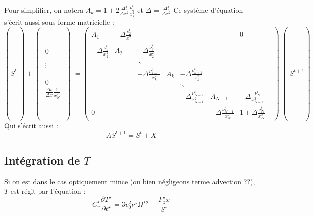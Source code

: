 Pour simplifier, on notera $A_k = 1 + 2 \frac{\Delta t}{\Delta x^2}\frac{\nu_k^t}{x_k^2}$ et $\Delta = \frac{\Delta t}{\Delta x^2}$
Ce système d'équation s'écrit aussi sous forme matricielle :
\begin{equation}
  \left(S^t\middle) + 
  \middle(\begin{matrix}
    0 \\
    \\
    \\
    \vdots \\
    \\
    \\
    \\
    0 \\
    \frac{\Delta t}{\Delta x}\frac{1}{x_N^2}
  \end{matrix}\middle)
  =
  \begin{pmatrix}
A_1                            & -\Delta\frac{\nu_{2}^t}{x_1^2} &  & & & & 0\\
-\Delta \frac{\nu_{1}^t}{x_2^2} & A_2                           & -\Delta\frac{\nu_{3}^t}{x_2^2} & & & &\\
    &        & \ddots                          &  & & & &\\
    &        & -\Delta \frac{\nu_{k-1}^t}{x_k^2} & A_k    & -\Delta \frac{\nu_{k+1}^t}{x_k^2} & &\\
    &        &                                 & & \ddots                          & & \\
    & & & & -\Delta \frac{\nu_{N-2}^t}{x_{N-1}^2} & A_{N-1} & -\Delta \frac{\nu_{N}^t}{x_{N-1}^2}\\
    0 & & & & & -\Delta \frac{\nu_{N-1}^t}{x_N^2} & 1 + \Delta \frac{\nu_N^t}{x_N^2}
  \end{pmatrix} \middle(S^{t+1}\right)
\end{equation}
Qui s'écrit aussi :
\begin{equation}
  AS^{t+1} = S^t + X 
\end{equation}

\subsection{Intégration de $T$}
\label{subsec:integration_T}

Si on est dans le cas optiquement mince (ou bien négligeons terme advection ??), $T$ est régit par l'équation :
\begin{equation}
  C_v^\star \frac{\partial T^\star}{\partial t^\star} = 3v_0^2\nu^\star \Omega^\star{}^2 - \frac{F_z^\star x}{S^\star}
\end{equation}

